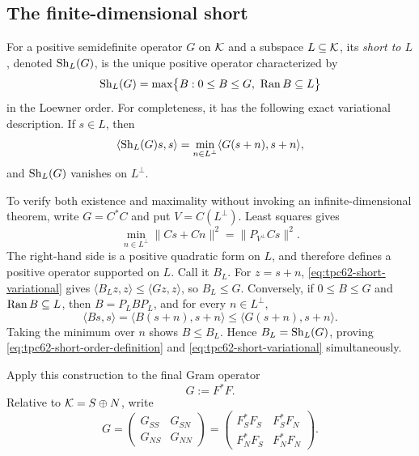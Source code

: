 \subsection{The finite-dimensional short}

For a positive semidefinite operator \(G\) on \(\mathcal K\) and a subspace
\(L\subseteq\mathcal K\), its \emph{short to \(L\)}, denoted \(\operatorname{Sh}_L(G)\), is
the unique positive operator characterized by
\begin{equation}
 \operatorname{Sh}_L(G)
 =\max\bigl\{B:0\le B\le G,\ \operatorname{Ran} B\subseteq L\bigr\}
 \label{eq:tpc62-short-order-definition}
\end{equation}
in the Loewner order.  For completeness, it has the following exact
variational description.  If \(s\in L\), then
\begin{equation}
 \left\langle\operatorname{Sh}_L(G)s,s\right\rangle
 =\min_{n\in L^\perp}\langle G(s+n),s+n\rangle,
 \label{eq:tpc62-short-variational}
\end{equation}
and \(\operatorname{Sh}_L(G)\) vanishes on \(L^\perp\).

To verify both existence and maximality without invoking an
infinite-dimensional theorem, write \(G=C^*C\) and put
\(V=C(L^\perp)\).  Least squares gives
\begin{equation}
 \min_{n\in L^\perp}\|Cs+Cn\|^2
 =\|P_{V^\perp}Cs\|^2.
 \label{eq:tpc62-short-least-squares}
\end{equation}
The right-hand side is a positive quadratic form on \(L\), and therefore
defines a positive operator supported on \(L\).  Call it \(B_L\).  For
\(z=s+n\), \eqref{eq:tpc62-short-variational} gives
\(\langle B_Lz,z\rangle\le\langle Gz,z\rangle\), so \(B_L\le G\).
Conversely, if \(0\le B\le G\) and \(\operatorname{Ran} B\subseteq L\), then
\(B=P_LBP_L\), and for every \(n\in L^\perp\),
\[
 \langle Bs,s\rangle
 =\langle B(s+n),s+n\rangle
 \le\langle G(s+n),s+n\rangle.
\]
Taking the minimum over \(n\) shows \(B\le B_L\).  Hence
\(B_L=\operatorname{Sh}_L(G)\), proving \eqref{eq:tpc62-short-order-definition} and
\eqref{eq:tpc62-short-variational} simultaneously.

Apply this construction to the final Gram operator
\begin{equation}
 G:=F^*F.
 \label{eq:tpc62-final-Gram}
\end{equation}
Relative to \(\mathcal K=S\oplus N\), write
\begin{equation}
 G=
 \begin{pmatrix}
  G_{SS}&G_{SN}\\
  G_{NS}&G_{NN}
 \end{pmatrix}
 =
 \begin{pmatrix}
  F_S^*F_S&F_S^*F_N\\
  F_N^*F_S&F_N^*F_N
 \end{pmatrix}.
 \label{eq:tpc62-Gram-blocks}
\end{equation}

